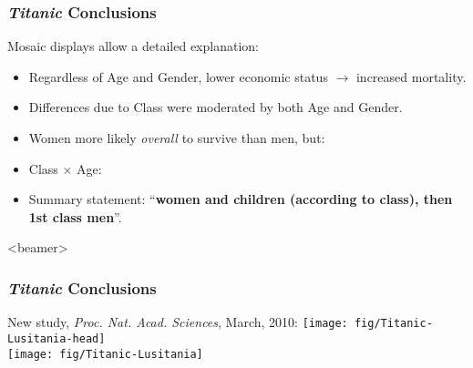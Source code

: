 \begin{frame}
\frametitle{\textit{Titanic} Conclusions}
Mosaic displays allow a detailed explanation:
\begin{itemize}
\item Regardless of Age and Gender, lower economic
status $\longrightarrow$  increased mortality.
\item Differences due to Class were moderated by both Age and Gender.
\item Women  more likely \emph{overall} to survive than men, but:

\item  Class $\times$ Age: 

\item Summary statement:\newline
``\textbf{women and children (according to class), then 1st class men}''.
\end{itemize}
\end{frame}

\begin{frame}<beamer>
\frametitle{\textit{Titanic} Conclusions}
\begin{center}
New study, \emph{Proc. Nat. Acad. Sciences}, March, 2010:  
  \texttt{[image: fig/Titanic-Lusitania-head]}\\
  \texttt{[image: fig/Titanic-Lusitania]}
\end{center}
\end{frame}
\endinput

